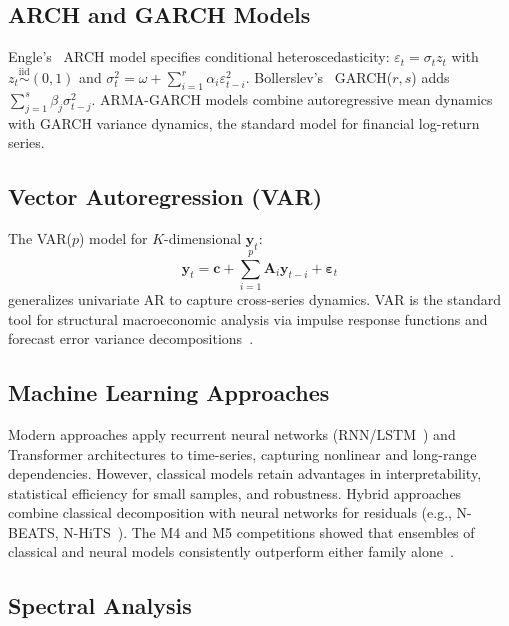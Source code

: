 \documentclass[conference]{IEEEtran}
\theoremstyle{definition}
\begin{document}
\subsection{ARCH and GARCH Models}

Engle's~\cite{engle1982autoregressive} ARCH model specifies conditional
heteroscedasticity:
$\varepsilon_t = \sigma_t z_t$ with $z_t \stackrel{\text{iid}}{\sim}(0,1)$ and
$\sigma_t^2 = \omega + \sum_{i=1}^r \alpha_i \varepsilon_{t-i}^2$.
Bollerslev's~\cite{bollerslev1986generalized} GARCH($r,s$) adds
$\sum_{j=1}^s \beta_j \sigma_{t-j}^2$.
ARMA-GARCH models combine autoregressive mean dynamics with GARCH variance
dynamics, the standard model for financial log-return series.

\subsection{Vector Autoregression (VAR)}

The VAR($p$) model for $K$-dimensional $\mathbf{y}_t$:
\begin{equation}
  \mathbf{y}_t = \mathbf{c} + \sum_{i=1}^p \mathbf{A}_i \mathbf{y}_{t-i}
                 + \boldsymbol{\varepsilon}_t
  \label{eq:var}
\end{equation}
generalizes univariate AR to capture cross-series dynamics.
VAR is the standard tool for structural macroeconomic analysis via impulse
response functions and forecast error variance decompositions~\cite{sims1980macroeconomics,lutkepohl2005new}.

\subsection{Machine Learning Approaches}

Modern approaches apply recurrent neural networks
(RNN/LSTM~\cite{hochreiter1997long}) and Transformer architectures to
time-series, capturing nonlinear and long-range dependencies. However,
classical models retain advantages in interpretability, statistical
efficiency for small samples, and robustness. Hybrid approaches combine
classical decomposition with neural networks for residuals (e.g., N-BEATS,
N-HiTS~\cite{oreshkin2019nbeats}). The M4 and M5 competitions showed that
ensembles of classical and neural models consistently outperform either
family alone~\cite{makridakis2018m4}.

\subsection{Spectral Analysis}
\end{document}
